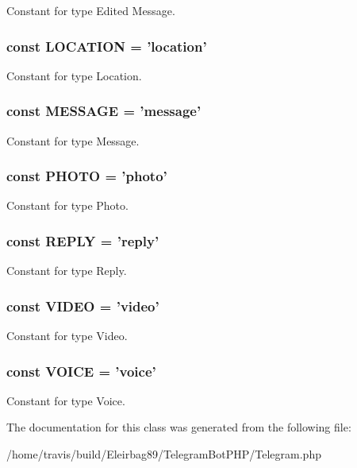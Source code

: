 Constant for type Edited Message. \hypertarget{class_telegram_aca699735a6cec340e45cde5c623bdb32}{
\subsubsection[{L\-O\-C\-A\-T\-I\-O\-N}]{\setlength{\rightskip}{0pt plus 5cm}const L\-O\-C\-A\-T\-I\-O\-N = 'location'}}\label{class_telegram_aca699735a6cec340e45cde5c623bdb32}
Constant for type Location. \hypertarget{class_telegram_af9b451d04eb24044a2d4112be10de570}{
\subsubsection[{M\-E\-S\-S\-A\-G\-E}]{\setlength{\rightskip}{0pt plus 5cm}const M\-E\-S\-S\-A\-G\-E = 'message'}}\label{class_telegram_af9b451d04eb24044a2d4112be10de570}
Constant for type Message. \hypertarget{class_telegram_a0aeb08e94e66f9d958f565530b6b6a80}{
\subsubsection[{P\-H\-O\-T\-O}]{\setlength{\rightskip}{0pt plus 5cm}const P\-H\-O\-T\-O = 'photo'}}\label{class_telegram_a0aeb08e94e66f9d958f565530b6b6a80}
Constant for type Photo. \hypertarget{class_telegram_acb63774895b195d4c22afe2b089a3ddd}{
\subsubsection[{R\-E\-P\-L\-Y}]{\setlength{\rightskip}{0pt plus 5cm}const R\-E\-P\-L\-Y = 'reply'}}\label{class_telegram_acb63774895b195d4c22afe2b089a3ddd}
Constant for type Reply. \hypertarget{class_telegram_a333a9b0a1034beea1b4b505f30885cea}{
\subsubsection[{V\-I\-D\-E\-O}]{\setlength{\rightskip}{0pt plus 5cm}const V\-I\-D\-E\-O = 'video'}}\label{class_telegram_a333a9b0a1034beea1b4b505f30885cea}
Constant for type Video. \hypertarget{class_telegram_a12e48e3d10ee66d0a6ca34c207d8e282}{
\subsubsection[{V\-O\-I\-C\-E}]{\setlength{\rightskip}{0pt plus 5cm}const V\-O\-I\-C\-E = 'voice'}}\label{class_telegram_a12e48e3d10ee66d0a6ca34c207d8e282}
Constant for type Voice. 

The documentation for this class was generated from the following file\-:\begin{DoxyCompactItemize}
\item 
/home/travis/build/\-Eleirbag89/\-Telegram\-Bot\-P\-H\-P/Telegram.\-php\end{DoxyCompactItemize}
